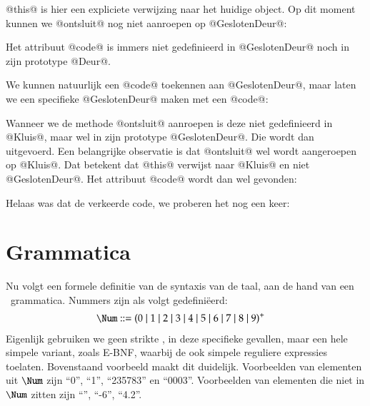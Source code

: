
@this@ is hier een expliciete verwijzing naar het huidige object. Op dit moment kunnen we @ontsluit@ nog niet aanroepen op @GeslotenDeur@:


Het attribuut @code@ is immers niet gedefinieerd in @GeslotenDeur@ noch in zijn prototype @Deur@.

We kunnen natuurlijk een @code@ toekennen aan @GeslotenDeur@, maar laten we een specifieke @GeslotenDeur@ maken met een @code@:


Wanneer we de methode @ontsluit@ aanroepen is deze niet gedefinieerd in @Kluis@, maar wel in zijn prototype @GeslotenDeur@. Die wordt dan uitgevoerd. Een belangrijke observatie is dat @ontsluit@ wel wordt aangeroepen op @Kluis@. Dat betekent dat @this@ verwijst naar @Kluis@ en niet @GeslotenDeur@. Het attribuut @code@ wordt dan wel gevonden:


Helaas was dat de verkeerde code, we proberen het nog een keer:



\section{Grammatica}

Nu volgt een formele definitie van de syntaxis van de taal, aan de hand van een \BNF\ grammatica. Nummers zijn als volgt gedefiniëerd:
\begin{align*}
  \Num \GrammarDef (0 \mid 1 \mid 2 \mid 3 \mid 4 \mid 5 \mid 6 \mid 7 \mid 8 \mid 9)^+
\end{align*}
Eigenlijk gebruiken we geen strikte \BNF, in deze specifieke gevallen, maar een hele simpele variant, zoals \textsc{E-BNF}, waarbij de ook simpele reguliere expressies toelaten.%
Bovenstaand voorbeeld maakt dit duidelijk. Voorbeelden van elementen uit $\Num$ zijn ``0'', ``1'', ``235783'' en ``0003''. Voorbeelden van elementen die niet in $\Num$ zitten zijn ``'', ``-6'', ``4.2''.

